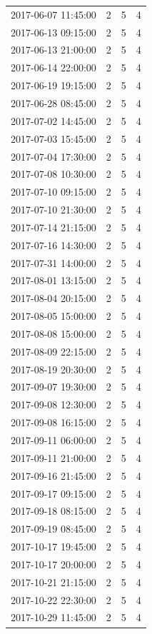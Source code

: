 \begin{tabular}{lrrr}
2017-06-07 11:45:00 & 2 & 5 & 4 \\
2017-06-13 09:15:00 & 2 & 5 & 4 \\
2017-06-13 21:00:00 & 2 & 5 & 4 \\
2017-06-14 22:00:00 & 2 & 5 & 4 \\
2017-06-19 19:15:00 & 2 & 5 & 4 \\
2017-06-28 08:45:00 & 2 & 5 & 4 \\
2017-07-02 14:45:00 & 2 & 5 & 4 \\
2017-07-03 15:45:00 & 2 & 5 & 4 \\
2017-07-04 17:30:00 & 2 & 5 & 4 \\
2017-07-08 10:30:00 & 2 & 5 & 4 \\
2017-07-10 09:15:00 & 2 & 5 & 4 \\
2017-07-10 21:30:00 & 2 & 5 & 4 \\
2017-07-14 21:15:00 & 2 & 5 & 4 \\
2017-07-16 14:30:00 & 2 & 5 & 4 \\
2017-07-31 14:00:00 & 2 & 5 & 4 \\
2017-08-01 13:15:00 & 2 & 5 & 4 \\
2017-08-04 20:15:00 & 2 & 5 & 4 \\
2017-08-05 15:00:00 & 2 & 5 & 4 \\
2017-08-08 15:00:00 & 2 & 5 & 4 \\
2017-08-09 22:15:00 & 2 & 5 & 4 \\
2017-08-19 20:30:00 & 2 & 5 & 4 \\
2017-09-07 19:30:00 & 2 & 5 & 4 \\
2017-09-08 12:30:00 & 2 & 5 & 4 \\
2017-09-08 16:15:00 & 2 & 5 & 4 \\
2017-09-11 06:00:00 & 2 & 5 & 4 \\
2017-09-11 21:00:00 & 2 & 5 & 4 \\
2017-09-16 21:45:00 & 2 & 5 & 4 \\
2017-09-17 09:15:00 & 2 & 5 & 4 \\
2017-09-18 08:15:00 & 2 & 5 & 4 \\
2017-09-19 08:45:00 & 2 & 5 & 4 \\
2017-10-17 19:45:00 & 2 & 5 & 4 \\
2017-10-17 20:00:00 & 2 & 5 & 4 \\
2017-10-21 21:15:00 & 2 & 5 & 4 \\
2017-10-22 22:30:00 & 2 & 5 & 4 \\
2017-10-29 11:45:00 & 2 & 5 & 4 \\

\end{tabular}
